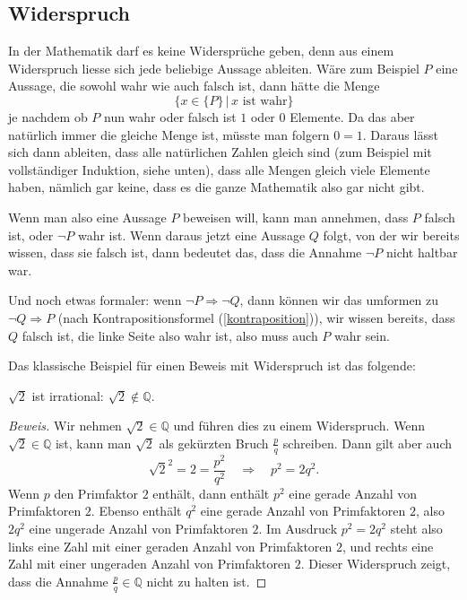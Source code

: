 \subsection{Widerspruch\label{widerspruchsbeweis}}
%
%
In der Mathematik darf es keine Widersprüche geben, denn aus einem
Widerspruch liesse sich jede beliebige Aussage ableiten. Wäre zum
Beispiel $P$ eine Aussage, die sowohl wahr wie auch falsch ist,
dann hätte die Menge
\[
\{x\in\{P\}\,|\, \text{$x$ ist wahr}\}
\]
je nachdem ob $P$ nun wahr oder falsch ist $1$ oder $0$ Elemente.
Da das aber natürlich immer die gleiche Menge ist, müsste man
folgern $0=1$. Daraus lässt sich dann ableiten, dass alle natürlichen
Zahlen gleich sind (zum Beispiel mit vollständiger Induktion, siehe
unten), dass alle Mengen gleich viele Elemente haben, nämlich gar
keine, dass es die ganze Mathematik also gar nicht gibt.

Wenn man also eine Aussage $P$ beweisen will, kann man annehmen,
dass $P$ falsch ist, oder $\neg P$ wahr ist. Wenn daraus jetzt
eine Aussage $Q$ folgt, von der wir bereits wissen, dass sie falsch
ist, dann bedeutet das, dass die Annahme $\neg P$ nicht haltbar
war.

Und noch etwas formaler: wenn $\neg P\Rightarrow \neg Q$, dann können
wir das umformen zu $\neg Q\Rightarrow P$ (nach Kontrapositionsformel
(\ref{kontraposition})), wir wissen bereits, dass
$Q$ falsch ist, die linke Seite also wahr ist, also muss auch $P$
wahr sein.

Das klassische Beispiel für einen Beweis mit Widerspruch ist das 
folgende:
\begin{satz}$\sqrt{2}$ ist irrational: $\sqrt{2}\not\in\mathbb Q$.
%
\end{satz}
\begin{proof}[Beweis]
Wir nehmen $\sqrt{2}\in\mathbb Q$ und führen dies zu einem
Widerspruch. Wenn $\sqrt{2}\in\mathbb Q$ ist, kann man $\sqrt{2}$
als gekürzten Bruch $\frac{p}{q}$ schreiben. Dann gilt aber
auch
\[
\sqrt{2}^2=2=\frac{p^2}{q^2}\quad\Rightarrow\quad p^2=2q^2.
\]
Wenn $p$ den Primfaktor $2$ enthält, dann enthält $p^2$
eine gerade Anzahl von Primfaktoren $2$. Ebenso enthält
$q^2$ eine gerade Anzahl von Primfaktoren $2$, also $2q^2$
eine ungerade Anzahl von Primfaktoren $2$.
Im Ausdruck $p^2=2q^2$ steht also links eine Zahl mit einer
geraden Anzahl von Primfaktoren $2$, und rechts eine Zahl mit
einer ungeraden Anzahl von Primfaktoren $2$.
Dieser Widerspruch zeigt, dass die
Annahme $\frac{p}q\in\mathbb Q$ nicht zu halten ist.
\end{proof}

